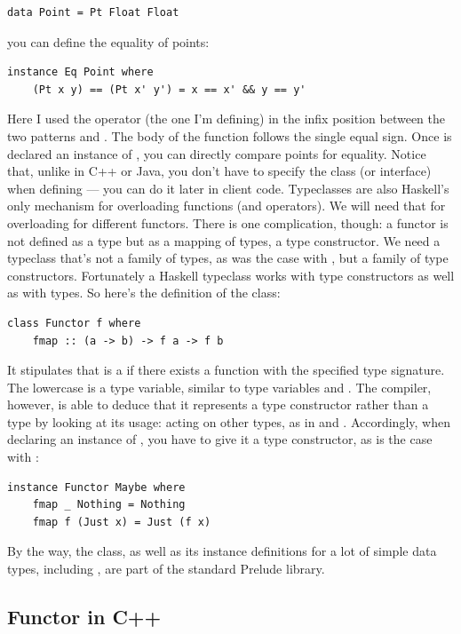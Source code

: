 \begin{Verbatim}
data Point = Pt Float Float
\end{Verbatim}
you can define the equality of points:

\begin{Verbatim}
instance Eq Point where
    (Pt x y) == (Pt x' y') = x == x' && y == y'
\end{Verbatim}
Here I used the operator \code{(==)} (the one I'm defining) in the
infix position between the two patterns  and
. The body of the function follows the
single equal sign. Once  is declared an instance of
, you can directly compare points for equality. Notice that,
unlike in C++ or Java, you don't have to specify the  class
(or interface) when defining  --- you can do it later in
client code. Typeclasses are also Haskell's only mechanism for
overloading functions (and operators). We will need that for overloading
 for different functors. There is one complication, though:
a functor is not defined as a type but as a mapping of types, a type
constructor. We need a typeclass that's not a family of types, as was
the case with , but a family of type constructors.
Fortunately a Haskell typeclass works with type constructors as well as
with types. So here's the definition of the  class:

\begin{Verbatim}
class Functor f where
    fmap :: (a -> b) -> f a -> f b
\end{Verbatim}
It stipulates that  is a  if there exists a
function  with the specified type signature. The lowercase
 is a type variable, similar to type variables  and
. The compiler, however, is able to deduce that it represents
a type constructor rather than a type by looking at its usage: acting on
other types, as in  and . Accordingly, when
declaring an instance of , you have to give it a type
constructor, as is the case with :

\begin{Verbatim}
instance Functor Maybe where
    fmap _ Nothing = Nothing
    fmap f (Just x) = Just (f x)
\end{Verbatim}
By the way, the  class, as well as its instance
definitions for a lot of simple data types, including ,
are part of the standard Prelude library.

\subsection{Functor in C++}

